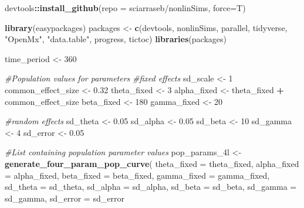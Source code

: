 \documentclass[
12pt, %
twoside,
english]{guelphthesis}
\newenvironment{Shaded}{\begin{snugshade}}{\end{snugshade}}
\newcommand{\AttributeTok}[1]{\textcolor[rgb]{0.13,0.29,0.53}{#1}}
\newcommand{\CommentTok}[1]{\textcolor[rgb]{0.56,0.35,0.01}{\textit{#1}}}
\newcommand{\DecValTok}[1]{\textcolor[rgb]{0.00,0.00,0.81}{#1}}
\newcommand{\FloatTok}[1]{\textcolor[rgb]{0.00,0.00,0.81}{#1}}
\newcommand{\FunctionTok}[1]{\textcolor[rgb]{0.13,0.29,0.53}{\textbf{#1}}}
\newcommand{\NormalTok}[1]{#1}
\newcommand{\OtherTok}[1]{\textcolor[rgb]{0.56,0.35,0.01}{#1}}
\newcommand{\SpecialCharTok}[1]{\textcolor[rgb]{0.81,0.36,0.00}{\textbf{#1}}}
\newcommand{\StringTok}[1]{\textcolor[rgb]{0.31,0.60,0.02}{#1}}
\begin{document}
\restoreparindent\label{sim-code}
\begin{Shaded}
\begin{Highlighting}[numbers=left,,]
\NormalTok{devtools}\SpecialCharTok{::}\FunctionTok{install\_github}\NormalTok{(}\AttributeTok{repo =} \StringTok{\textquotesingle{}sciarraseb/nonlinSims\textquotesingle{}}\NormalTok{, }\AttributeTok{force=}\NormalTok{T)}

\FunctionTok{library}\NormalTok{(easypackages)}
\NormalTok{packages }\OtherTok{\textless{}{-}} \FunctionTok{c}\NormalTok{(}\StringTok{\textquotesingle{}devtools\textquotesingle{}}\NormalTok{, }\StringTok{\textquotesingle{}nonlinSims\textquotesingle{}}\NormalTok{, }\StringTok{\textquotesingle{}parallel\textquotesingle{}}\NormalTok{, }\StringTok{\textquotesingle{}tidyverse\textquotesingle{}}\NormalTok{, }\StringTok{"OpenMx"}\NormalTok{, }\StringTok{"data.table"}\NormalTok{, }\StringTok{\textquotesingle{}progress\textquotesingle{}}\NormalTok{, }\StringTok{\textquotesingle{}tictoc\textquotesingle{}}\NormalTok{)}
\FunctionTok{libraries}\NormalTok{(packages)}

\NormalTok{time\_period }\OtherTok{\textless{}{-}} \DecValTok{360}

\CommentTok{\#Population values for parameters }
\CommentTok{\#fixed effects}
\NormalTok{sd\_scale }\OtherTok{\textless{}{-}} \DecValTok{1}
\NormalTok{common\_effect\_size }\OtherTok{\textless{}{-}} \FloatTok{0.32}
\NormalTok{theta\_fixed }\OtherTok{\textless{}{-}} \DecValTok{3}
\NormalTok{alpha\_fixed }\OtherTok{\textless{}{-}}\NormalTok{ theta\_fixed }\SpecialCharTok{+}\NormalTok{ common\_effect\_size}
\NormalTok{beta\_fixed }\OtherTok{\textless{}{-}} \DecValTok{180}
\NormalTok{gamma\_fixed }\OtherTok{\textless{}{-}} \DecValTok{20}

\CommentTok{\#random effects }
\NormalTok{sd\_theta }\OtherTok{\textless{}{-}} \FloatTok{0.05}
\NormalTok{sd\_alpha }\OtherTok{\textless{}{-}} \FloatTok{0.05}
\NormalTok{sd\_beta }\OtherTok{\textless{}{-}} \DecValTok{10}
\NormalTok{sd\_gamma }\OtherTok{\textless{}{-}} \DecValTok{4}
\NormalTok{sd\_error }\OtherTok{\textless{}{-}} \FloatTok{0.05}

\CommentTok{\#List containing population parameter values}
\NormalTok{pop\_params\_4l }\OtherTok{\textless{}{-}} \FunctionTok{generate\_four\_param\_pop\_curve}\NormalTok{(}
  \AttributeTok{theta\_fixed =}\NormalTok{  theta\_fixed, }\AttributeTok{alpha\_fixed =}\NormalTok{ alpha\_fixed, }
   \AttributeTok{beta\_fixed =}\NormalTok{ beta\_fixed, }\AttributeTok{gamma\_fixed =}\NormalTok{ gamma\_fixed, }
   \AttributeTok{sd\_theta =}\NormalTok{ sd\_theta, }\AttributeTok{sd\_alpha =}\NormalTok{ sd\_alpha, }
   \AttributeTok{sd\_beta =}\NormalTok{ sd\_beta, }\AttributeTok{sd\_gamma =}\NormalTok{ sd\_gamma, }\AttributeTok{sd\_error =}\NormalTok{ sd\_error}




\end{Highlighting}
\end{Shaded}
\end{document}
